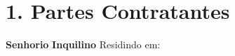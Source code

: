 \section*{1. Partes Contratantes}
\textbf{Senhorio}
\ContractLandlordsPT
\vspace{0.5cm}
\textbf{Inquilino}
\ContractTenantsPT
Residindo em: \Propaddress
